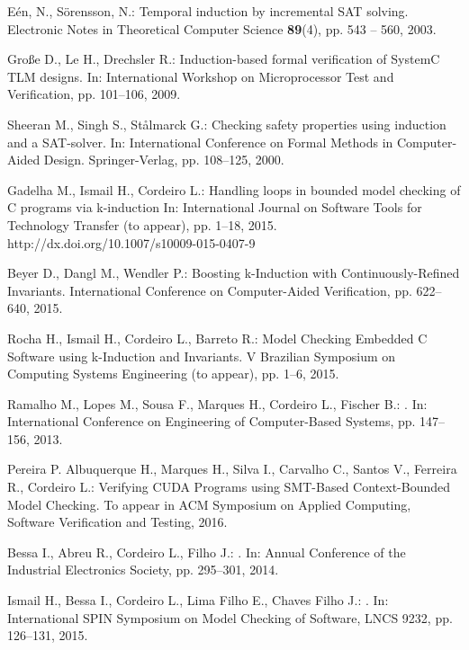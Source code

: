 \documentclass{acm_sen_article}
\begin{document}
\begin{thebibliography}{1}
E{\'{e}}n, N., S{\"{o}}rensson, N.:
\newblock Temporal induction by incremental {SAT} solving.
\newblock Electronic Notes in Theoretical Computer Science \textbf{89}(4), pp. 543 -- 560, 2003.

Gro{\ss}e D., Le H., Drechsler R.:
\newblock Induction-based formal verification of {SystemC TLM} designs.
\newblock In: International Workshop on Microprocessor Test and Verification, pp. 101--106, 2009.

Sheeran M., Singh S., St{\aa}lmarck G.:
\newblock Checking safety properties using induction and a {SAT}-solver.
\newblock In: International Conference on Formal Methods in Computer-Aided Design. Springer-Verlag, pp. 108--125, 2000.

Gadelha M., Ismail H., Cordeiro L.:
\newblock Handling loops in bounded model checking of C programs via k-induction
\newblock In: International Journal on Software Tools for Technology Transfer (to appear), pp. 1--18, 2015.
\newblock http://dx.doi.org/10.1007/s10009-015-0407-9

Beyer D., Dangl M., Wendler P.:
\newblock Boosting k-Induction with Continuously-Refined Invariants.
\newblock International Conference on Computer-Aided Verification, pp. 622--640, 2015.

Rocha H., Ismail H., Cordeiro L., Barreto R.:
\newblock Model Checking Embedded C Software using k-Induction and Invariants. 
\newblock V Brazilian Symposium on Computing Systems Engineering (to appear), pp. 1--6, 2015.

Ramalho M., Lopes M., Sousa F., Marques H., Cordeiro L., Fischer B.:
.
\newblock In: International Conference on Engineering of Computer-Based Systems, pp. 147--156, 2013.

Pereira P.  Albuquerque H., Marques H., Silva I., Carvalho C., Santos V., Ferreira R., Cordeiro L.: 
\newblock Verifying CUDA Programs using SMT-Based Context-Bounded Model Checking. 
\newblock To appear in ACM Symposium on Applied Computing, Software Verification and Testing, 2016. 

Bessa I., Abreu R., Cordeiro L., Filho J.:
. 
\newblock In: Annual Conference of the Industrial Electronics Society, pp. 295--301, 2014.

Ismail H., Bessa I., Cordeiro L., Lima Filho E., Chaves Filho J.:
. 
\newblock In: International SPIN Symposium on Model Checking of Software, LNCS 9232, pp. 126--131, 2015.


\end{thebibliography}
\end{document}

